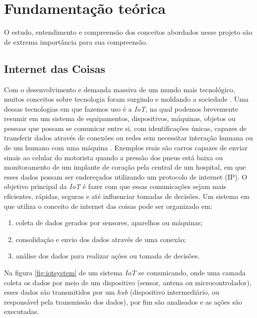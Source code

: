 \documentclass[../../layout.tex]{subfiles}
\begin{document}
\chapter{Fundamentação teórica}
\hspace*{3em}O estudo, entendimento e compreensão dos conceitos abordados nesse projeto são de extrema importância para sua compreensão.

\section{Internet das Coisas}
\hspace*{3em}Com o desenvolvimento e demanda massiva de um mundo mais tecnológico, muitos conceitos sobre tecnologia foram surgindo e moldando a sociedade . Uma dessas tecnologias em que fazemos uso é a \emph{IoT}, na qual podemos brevemente resumir em um sistema de equipamentos, dispositivos, máquinas, objetos ou pessoas que possam se comunicar entre si, com identificações únicas, capazes de transferir dados através de conexões ou redes sem necessitar interação humana ou de um humano com uma máquina \cite{iot}. Exemplos reais são carros capazes de enviar sinais ao celular do motorista quando a pressão dos pneus está baixa ou monitoramento de um implante de coração pela central de um hospital, em que esses dados possam ser endereçados utilizando um protocolo de internet (IP). O objetivo principal da \emph{IoT} é fazer com que essas comunicações sejam mais eficientes, rápidas, seguras e até influenciar tomadas de decisões. Um sistema em que utiliza o conceito de internet das coisas pode ser organizado em:

\begin{enumerate}[label=\alph*)]
\itemsep0em
\item coleta de dados gerados por sensores, aparelhos ou máquinas;
\item consolidação e envio dos dados através de uma conexão;
\item análise dos dados para realizar ações ou tomada de decisões.
\end{enumerate}

\hspace*{3em} Na figura \ref{fig:iotsystem} de um sistema \emph{IoT} se comunicando, onde uma camada coleta os dados por meio de um dispositivo (sensor, antena ou microcontrolador), esses dados são transmitidos por um \emph{hub} (dispositivo intermediário, ou responsável pela transmissão dos dados), por fim são analisados e as ações são executadas.
\end{document}
